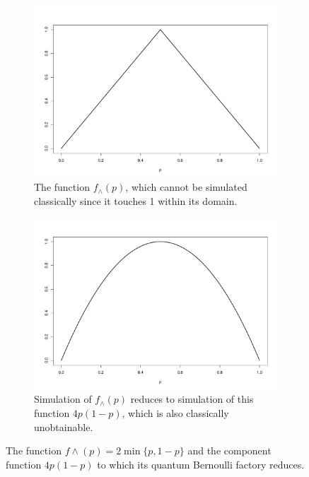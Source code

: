 \documentclass{article}
\theoremstyle{definition}
\begin{document}
\begin{figure} %
\centering
\begin{subfigure}{0.45\linewidth}
\centering
\includegraphics[width=\textwidth]{wedge_function.pdf}
\caption{The function $f_\wedge(p)$, which cannot be simulated classically since it touches 1 within its domain.}
\label{fig:wedge_fn}
\end{subfigure}%
\hfill
\begin{subfigure}{0.45\linewidth}
\centering
\includegraphics[width=\textwidth]{wedge_qbf_fn.pdf}
\caption{Simulation of $f_\wedge(p)$ reduces to simulation of this function $4p(1-p)$, which is also classically unobtainable.}
\label{fig:wedge_qbf_fn}
\end{subfigure}
\caption{The function $f\wedge(p)=2\min\{p, 1-p\}$ and the component function $4p(1-p)$ to which its quantum Bernoulli factory reduces.}
\end{figure}
\end{document}

